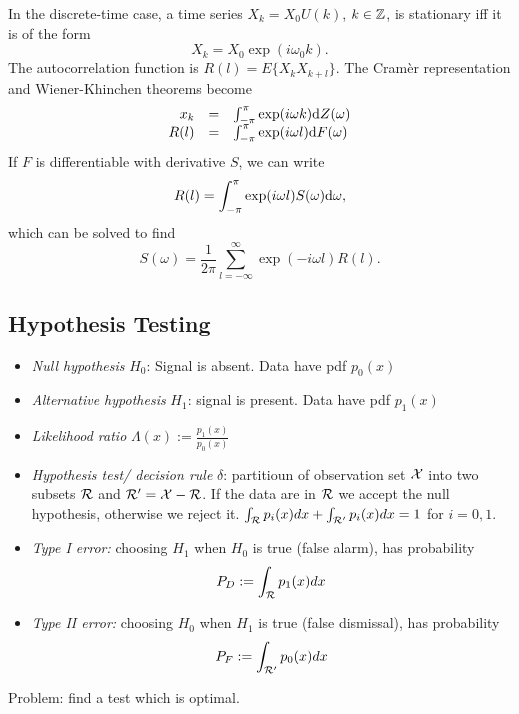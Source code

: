 In the discrete-time case, a time series $X_k=X_0 U(k)$, $k \in \mathbb{Z}$, is stationary iff it is of the form
\begin{equation}
X_k = X_0 \exp(i \omega_0 k).
\end{equation}
The autocorrelation function is $R(l)=E\{X_k X_{k+l} \}$. The Cram\`er representation and Wiener-Khinchen theorems become 
\begin{equation}
\begin{array}{rcl}
x_k & = & \int_{-\pi}^{\pi} \exp(i\omega k ) {\mbox{d}} Z(\omega) \\
R(l) & = & \int_{-\pi}^{\pi} \exp(i\omega l ) {\mbox{d}} F(\omega) 
\end{array}
\end{equation}
If $F$ is differentiable with derivative $S$, we can write
\begin{equation}
R(l)=\int_{-\pi}^{\pi} \exp(i \omega l) S(\omega) {\mbox{d}} \omega,
\end{equation}
which can be solved to find 
\begin{equation}
S(\omega)=\frac{1}{2\pi}\sum_{l=-\infty}^{\infty} \exp(-i\omega l) R(l).
\end{equation}


\subsection{Hypothesis Testing}
\begin{itemize}
\item \textit{Null hypothesis} $H_0$: Signal is absent. Data have pdf $p_0(x)$
\item \textit{Alternative hypothesis} $H_1$: signal is present. Data have pdf $p_1(x)$
\item \textit{Likelihood ratio} $\Lambda(x) := \frac{p_1(x)}{p_0(x)}$
\item \textit{Hypothesis test/ decision rule} $\delta$: partitioun of observation set $\mathcal{X}$ into two subsets $\mathcal{R}$ and $\mathcal{R}'=\mathcal{X}-\mathcal{R}$. If the data are in $\mathcal{R}$ we accept the null hypothesis, otherwise we reject it. $\int_{\mathcal{R}} p_i(x) dx+ \int_{\mathcal{R}'} p_i(x) dx=1$ for $i=0,1$.
\item \textit{Type I error:} choosing $H_1$ when $H_0$ is true (false alarm), has probability 
\begin{equation}
P_D := \int_{\mathcal{R}} p_1(x) dx
\end{equation}
\item \textit{Type II error:}  choosing $H_0$ when $H_1$ is true (false dismissal), has probability 
\begin{equation}
P_F := \int_{\mathcal{R}'} p_0(x) dx
\end{equation}
\end{itemize}
Problem: find a test which is optimal.

